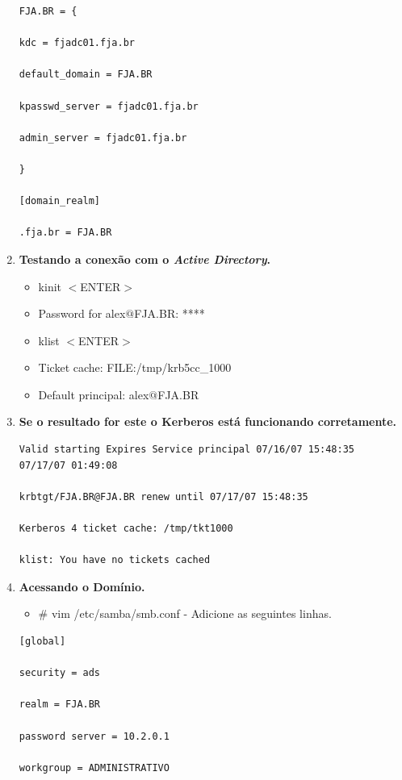 \begin{enumerate}
\begin{lstlisting}
FJA.BR = {

kdc = fjadc01.fja.br

default_domain = FJA.BR

kpasswd_server = fjadc01.fja.br

admin_server = fjadc01.fja.br

}

[domain_realm]

.fja.br = FJA.BR
\end{lstlisting}

	\item \textbf {Testando a conexão com o \textit{Active Directory}.}
		\begin{itemize}
			\item {kinit $<$ENTER$>$}
			\item {Password for alex$@$FJA.BR: ****}
			\item {klist $<$ENTER$>$}
			\item {Ticket cache: FILE:/tmp/krb5cc\_1000}
			\item {Default principal: alex$@$FJA.BR}
		\end{itemize}

	\item \textbf {Se o resultado for este o Kerberos está funcionando corretamente.}\\

		\begin{lstlisting}
Valid starting Expires Service principal 07/16/07 15:48:35  
07/17/07 01:49:08  

krbtgt/FJA.BR@FJA.BR renew until 07/17/07 15:48:35
	
Kerberos 4 ticket cache: /tmp/tkt1000
	
klist: You have no tickets cached
\end{lstlisting}

	\item \textbf{Acessando o Domínio.}
		\begin{itemize}
			\item {\# vim /etc/samba/smb.conf} -  Adicione as seguintes linhas.\\
		\end{itemize}

		\begin{lstlisting}
[global]

security = ads
		
realm = FJA.BR

password server = 10.2.0.1

workgroup = ADMINISTRATIVO


\end{lstlisting}
\end{enumerate}
